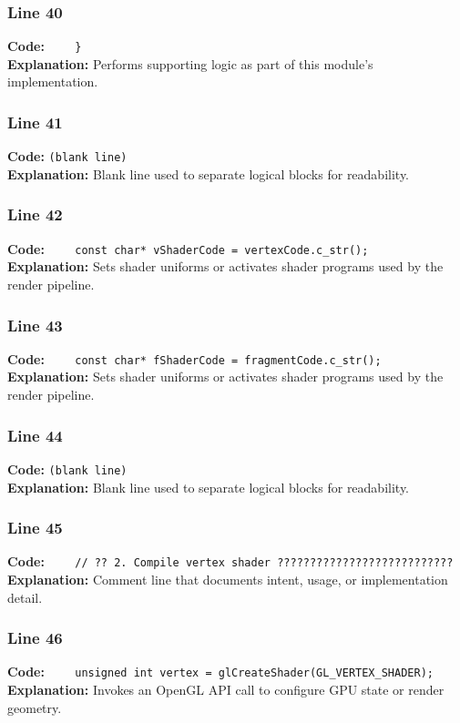 \documentclass[11pt,a4paper]{article}
\begin{document}
\subsubsection*{Line 40}
\textbf{Code:} \verb|    }|\\
\textbf{Explanation:} Performs supporting logic as part of this module's implementation.

\subsubsection*{Line 41}
\textbf{Code:} \texttt{(blank line)}\\
\textbf{Explanation:} Blank line used to separate logical blocks for readability.

\subsubsection*{Line 42}
\textbf{Code:} \verb|    const char* vShaderCode = vertexCode.c_str();|\\
\textbf{Explanation:} Sets shader uniforms or activates shader programs used by the render pipeline.

\subsubsection*{Line 43}
\textbf{Code:} \verb|    const char* fShaderCode = fragmentCode.c_str();|\\
\textbf{Explanation:} Sets shader uniforms or activates shader programs used by the render pipeline.

\subsubsection*{Line 44}
\textbf{Code:} \texttt{(blank line)}\\
\textbf{Explanation:} Blank line used to separate logical blocks for readability.

\subsubsection*{Line 45}
\textbf{Code:} \verb|    // ?? 2. Compile vertex shader ???????????????????????????|\\
\textbf{Explanation:} Comment line that documents intent, usage, or implementation detail.

\subsubsection*{Line 46}
\textbf{Code:} \verb|    unsigned int vertex = glCreateShader(GL_VERTEX_SHADER);|\\
\textbf{Explanation:} Invokes an OpenGL API call to configure GPU state or render geometry.
\end{document}
